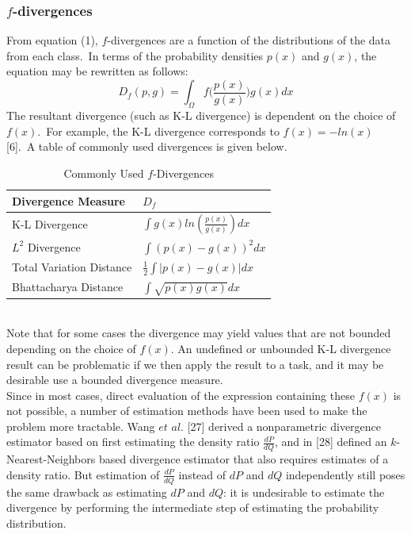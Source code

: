 \documentclass{article}
\begin{document}
	\subsubsection{\small $f$-divergences}
	\indent From equation (1), $f$-divergences are a function of the distributions of the data from each class.\ In terms of the probability densities $p(x)$ and $g(x)$, the equation may be rewritten as follows:\begin{equation}
		 D_f(p,g) = \int_{\Omega} f\bigg(\frac{p({x})}{g({x})}\bigg)g({x})dx
	\end{equation}The resultant divergence (such as K-L divergence) is dependent on the choice of $f(x)$.\ For example, the K-L divergence corresponds to $f(x) = -ln(x)$ [6].\  A table of commonly used divergences is given below.
	\begin{table}[ht]
	\caption{Commonly Used $f$-Divergences}
	\centering	
	\begin{tabular}[!h]{ |p{5cm}||p{4cm}|  }
		\hline
		Divergence Measure & $D_f$ \\ 
		\hline\hline
		K-L Divergence 	& $\int g(x)ln(\frac{p(x)}{g(x)})dx$ \\
		
		$L^2$ Divergence & $ \int (p(x)-g(x))^2dx$ \\
		
		Total Variation Distance & $ \frac{1}{2}\int \vert p(x)-g(x)\vert dx$ \\
		
		Bhattacharya Distance & $\int\sqrt{p(x)g(x)}dx$\\ 
		\hline 		
	\end{tabular}	
	\end{table}
	\\ [0.5ex]
	\indent Note that for some cases the divergence may yield values that are not bounded depending on the choice of $f(x)$. An undefined or unbounded K-L divergence result can be problematic if we then apply the result to a task, and it may be desirable use a bounded divergence measure. 	
	\\ [0.5ex]
	\indent Since in most cases, direct evaluation of the expression containing these $f(x)$ is not possible, a number of estimation methods have been used to make the problem more tractable. Wang $et$ $al$. [27] derived a nonparametric divergence estimator based on first estimating the density ratio $\frac{dP}{dQ}$, and in [28] defined an  $k$-Nearest-Neighbors based divergence estimator that also requires estimates of a density ratio. But estimation of $\frac{dP}{dQ}$ instead of $dP$ and $dQ$ independently still poses the same drawback as estimating $dP$ and $dQ$: it is undesirable to estimate the divergence by performing the intermediate step of estimating the probability distribution.
\end{document}
